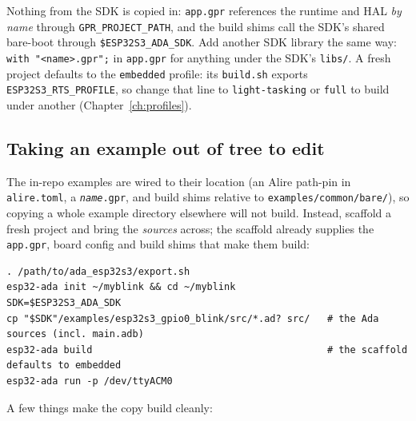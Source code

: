 Nothing from the SDK is copied in: \texttt{app.gpr} references the runtime and
HAL \emph{by name} through \texttt{GPR\_PROJECT\_PATH}, and the build shims call the
SDK's shared bare-boot through \texttt{\$ESP32S3\_ADA\_SDK}. Add another SDK library
the same way: \texttt{with "<name>.gpr";} in \texttt{app.gpr} for anything under the
SDK's \texttt{libs/}. A fresh project defaults to the \texttt{embedded} profile: its
\texttt{build.sh} exports \texttt{ESP32S3\_RTS\_PROFILE}, so change that line to
\texttt{light-tasking} or \texttt{full} to build under another
(Chapter~\ref{ch:profiles}).

\subsection{Taking an example out of tree to edit}

The in-repo examples are wired to their location (an Alire path-pin in
\texttt{alire.toml}, a \texttt{\textit{name}.gpr}, and build shims relative to
\texttt{examples/common/bare/}), so copying a whole example directory elsewhere
will not build. Instead, scaffold a fresh project and bring the \emph{sources}
across; the scaffold already supplies the \texttt{app.gpr}, board config and build
shims that make them build:

\begin{lstlisting}[style=sh]
. /path/to/ada_esp32s3/export.sh
esp32-ada init ~/myblink && cd ~/myblink
SDK=$ESP32S3_ADA_SDK
cp "$SDK"/examples/esp32s3_gpio0_blink/src/*.ad? src/   # the Ada sources (incl. main.adb)
esp32-ada build                                         # the scaffold defaults to embedded
esp32-ada run -p /dev/ttyACM0
\end{lstlisting}

A few things make the copy build cleanly:

